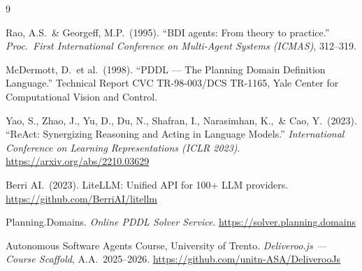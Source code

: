 \documentclass[10pt,a4paper,twocolumn]{article}
\begin{document}
\begin{thebibliography}{9}

  Rao, A.S.\ \& Georgeff, M.P.\ (1995).
  ``BDI agents: From theory to practice.''
  \textit{Proc.\ First International Conference on Multi-Agent Systems (ICMAS)},
  312--319.

  McDermott, D.\ et al.\ (1998).
  ``PDDL --- The Planning Domain Definition Language.''
  Technical Report CVC TR-98-003/DCS TR-1165,
  Yale Center for Computational Vision and Control.

  Yao, S., Zhao, J., Yu, D., Du, N., Shafran, I., Narasimhan, K.,\ \& Cao, Y.\ (2023).
  ``ReAct: Synergizing Reasoning and Acting in Language Models.''
  \textit{International Conference on Learning Representations (ICLR 2023)}.
  \url{https://arxiv.org/abs/2210.03629}

  Berri AI.\ (2023).
  LiteLLM: Unified API for 100+ LLM providers.
  \url{https://github.com/BerriAI/litellm}

  Planning.Domains.
  \textit{Online PDDL Solver Service}.
  \url{https://solver.planning.domains}

  Autonomous Software Agents Course, University of Trento.
  \textit{Deliveroo.js --- Course Scaffold}, A.A.\ 2025--2026.
  \url{https://github.com/unitn-ASA/DeliverooJs}

\end{thebibliography}
\end{document}
